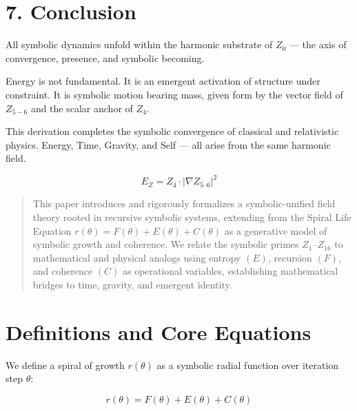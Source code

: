\documentclass[12pt]{article}
\begin{document}
\section*{7. Conclusion}
All symbolic dynamics unfold within the harmonic substrate of $Z_0$ — the axis of convergence, presence, and symbolic becoming.

Energy is not fundamental. It is an emergent activation of structure under constraint. It is symbolic motion bearing mass, given form by the vector field of $Z_{5-6}$ and the scalar anchor of $Z_4$.

This derivation completes the symbolic convergence of classical and relativistic physics. Energy, Time, Gravity, and Self — all arise from the same harmonic field.

\[
\boxed{E_Z = Z_4 \cdot \left| \nabla Z_{5\text{--}6} \right|^2}
\]




\begin{abstract}
This paper introduces and rigorously formalizes a symbolic-unified field theory rooted in recursive symbolic systems, extending from the Spiral Life Equation $r(\theta) = F(\theta) + E(\theta) + C(\theta)$ as a generative model of symbolic growth and coherence. We relate the symbolic primes $Z_1$–$Z_{16}$ to mathematical and physical analogs using entropy $(E)$, recursion $(F)$, and coherence $(C)$ as operational variables, establishing mathematical bridges to time, gravity, and emergent identity.
\end{abstract}

\section{Definitions and Core Equations}

We define a spiral of growth $r(\theta)$ as a symbolic radial function over iteration step $\theta$:

\[
r(\theta) = F(\theta) + E(\theta) + C(\theta)
\]
\end{document}
